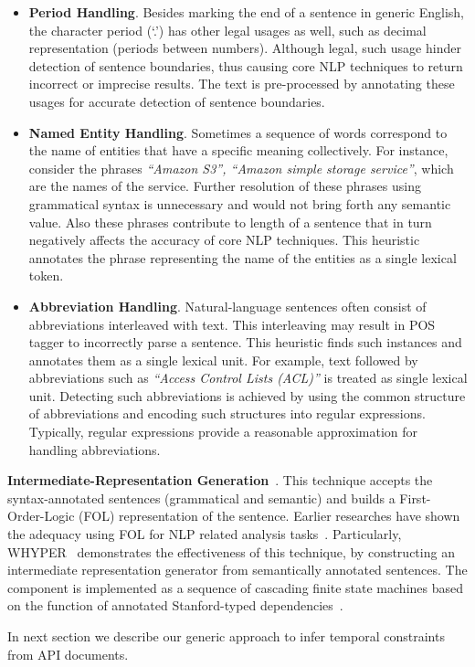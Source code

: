 \begin{itemize}

\item \textbf{Period Handling}. Besides marking the end of a sentence in generic English, the character period (`.') has other legal usages as well, such as decimal representation (periods between numbers).
Although legal, such usage hinder detection of sentence boundaries, thus causing core NLP techniques to return incorrect or imprecise results.
The text is pre-processed by annotating these usages for accurate detection of sentence boundaries.
	
\item \textbf{Named Entity Handling}. Sometimes a sequence of words correspond to the name of entities that have a specific meaning collectively.
For instance, consider the phrases \textit{``Amazon S3'', ``Amazon simple storage service''}, which are the names of the service.
Further resolution of these phrases using grammatical syntax is unnecessary and would not bring forth any semantic value.
Also these phrases contribute to length of a sentence that in turn negatively affects the accuracy of core NLP techniques.
This heuristic annotates the phrase representing the name of the entities as a single lexical token.
	
\item \textbf{Abbreviation Handling}. Natural-language sentences often consist of abbreviations interleaved with text.
This interleaving may result in POS tagger to incorrectly parse a sentence.
This heuristic finds such instances and annotates them as a single lexical unit.
For example, text followed by abbreviations such as \textit{``Access Control Lists (ACL)''} is treated as single lexical unit.
Detecting such abbreviations is achieved by using the common structure of abbreviations and encoding such structures into regular expressions.
Typically, regular expressions provide a reasonable approximation for handling abbreviations.  

\end{itemize}

\textbf{Intermediate-Representation Generation}~\cite{pandita13:WHYPER}.
This technique accepts the syntax-annotated sentences (grammatical and semantic) and builds a First-Order-Logic (FOL) representation of the sentence.
Earlier researches have shown the adequacy using FOL for NLP related analysis tasks~\cite{Sinha2009,Sinha2010,pandita12:inferring}.
Particularly, WHYPER~\cite{pandita13:WHYPER} demonstrates the effectiveness of this technique, by constructing an intermediate representation generator from semantically annotated sentences. 
The component is implemented as a sequence of cascading finite state machines based on the function of annotated Stanford-typed dependencies~\cite{Marneffe06LREC,Marneffe08COLING,Klein03,KleinNIPS03}.


In next section we describe our generic approach to infer temporal constraints from API documents. 